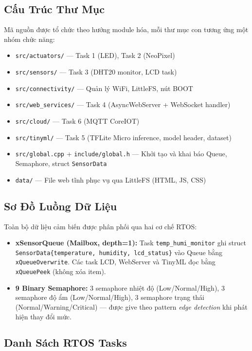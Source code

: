 \documentclass[12pt,a4paper]{article}
\begin{document}
\subsection{Cấu Trúc Thư Mục}

Mã nguồn được tổ chức theo hướng module hóa, mỗi thư mục con tương ứng một nhóm chức năng:

\begin{itemize}
    \item \texttt{src/actuators/} — Task 1 (LED), Task 2 (NeoPixel)
    \item \texttt{src/sensors/} — Task 3 (DHT20 monitor, LCD task)
    \item \texttt{src/connectivity/} — Quản lý WiFi, LittleFS, nút BOOT
    \item \texttt{src/web\_services/} — Task 4 (AsyncWebServer + WebSocket handler)
    \item \texttt{src/cloud/} — Task 6 (MQTT CoreIOT)
    \item \texttt{src/tinyml/} — Task 5 (TFLite Micro inference, model header, dataset)
    \item \texttt{src/global.cpp} + \texttt{include/global.h} — Khởi tạo và khai báo Queue, Semaphore, struct \texttt{SensorData}
    \item \texttt{data/} — File web tĩnh phục vụ qua LittleFS (HTML, JS, CSS)
\end{itemize}

\subsection{Sơ Đồ Luồng Dữ Liệu}

Toàn bộ dữ liệu cảm biến được phân phối qua hai cơ chế RTOS:

\begin{itemize}
    \item \textbf{xSensorQueue (Mailbox, depth=1):} Task \texttt{temp\_humi\_monitor} ghi struct \texttt{SensorData\{temperature, humidity, lcd\_status\}} vào Queue bằng \texttt{xQueueOverwrite}. Các task LCD, WebServer và TinyML đọc bằng \texttt{xQueuePeek} (không xóa item).
    \item \textbf{9 Binary Semaphore:} 3 semaphore nhiệt độ (Low/Normal/High), 3 semaphore độ ẩm (Low/Normal/High), 3 semaphore trạng thái (Normal/Warning/Critical) — được give theo pattern \textit{edge detection} khi phát hiện thay đổi mức.
\end{itemize}

\subsection{Danh Sách RTOS Tasks}
\end{document}
